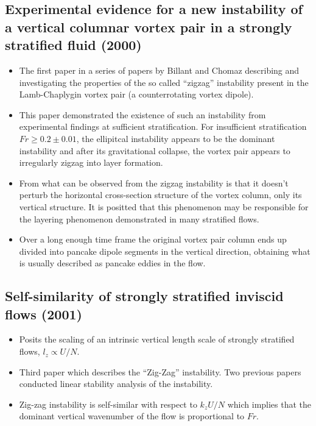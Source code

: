\documentclass{article}
\begin{document}
\subsection{Experimental evidence for a new instability of a
vertical columnar vortex pair in a strongly
stratified fluid (2000)}
\begin{itemize}
    \item The first paper in a series of papers by Billant and Chomaz describing
    and investigating the properties of the so called ``zigzag'' instability
    present in the Lamb-Chaplygin vortex pair (a counterrotating vortex dipole). 
    \item This paper demonstrated the existence of such an instability from
    experimental findings at sufficient stratification. For insufficient
    stratification $Fr \ge 0.2 \pm 0.01$, the ellipitcal instability appears to
    be the dominant instability and after its gravitational collapse, the vortex
    pair appears to irregularly zigzag into layer formation. 
    \item From what can be observed from the zigzag instability is that it
    doesn't perturb the horizontal cross-section structure of the vortex column,
    only its vertical structure. It is positted that this phenomenon may be
    responsible for the layering phenomenon demonstrated in many stratified
    flows. 
    \item Over a long enough time frame the original vortex pair column ends up
    divided into pancake dipole segments in the vertical direction, obtaining
    what is usually described as pancake eddies in the flow. 
\end{itemize}

\subsection{Self-similarity of strongly stratified inviscid flows (2001)}

\begin{itemize}
    \item Posits the scaling of an intrinsic vertical length scale of strongly
    stratified flows, $l_z \propto U/N$. 
    \item Third paper which describes the ``Zig-Zag'' instability. Two previous
    papers conducted linear stability analysis of the instability. 
    \item Zig-zag instability is self-similar with respect to $k_zU/N$ which
    implies that the dominant vertical wavenumber of the flow is proportional to
    $Fr$. 
\end{itemize}
\end{document}
